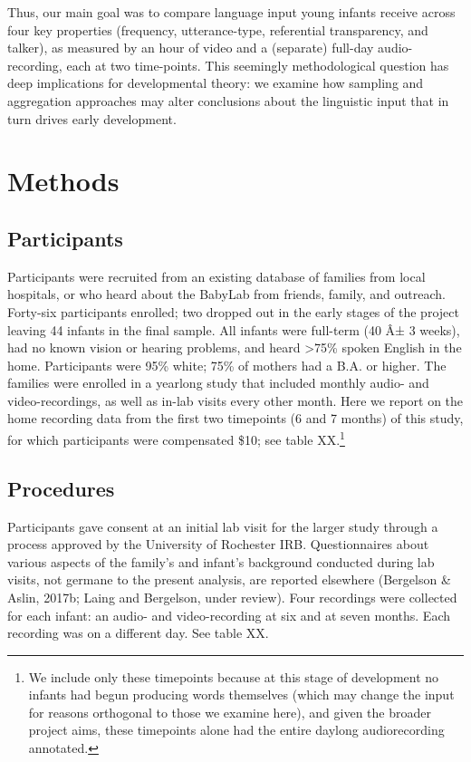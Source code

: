 \documentclass[man]{apa6}
\theoremstyle{definition}
\theoremstyle{definition}
\theoremstyle{definition}
\theoremstyle{remark}
\begin{document}
Thus, our main goal was to compare language input young infants receive
across four key properties (frequency, utterance-type, referential
transparency, and talker), as measured by an hour of video and a
(separate) full-day audio-recording, each at two time-points. This
seemingly methodological question has deep implications for
developmental theory: we examine how sampling and aggregation approaches
may alter conclusions about the linguistic input that in turn drives
early development.

\section{Methods}\label{methods}

\subsection{Participants}\label{participants}

Participants were recruited from an existing database of families from
local hospitals, or who heard about the BabyLab from friends, family,
and outreach. Forty-six participants enrolled; two dropped out in the
early stages of the project leaving 44 infants in the final sample. All
infants were full-term (40 Â± 3 weeks), had no known vision or hearing
problems, and heard \textgreater{}75\% spoken English in the home.
Participants were 95\% white; 75\% of mothers had a B.A. or higher. The
families were enrolled in a yearlong study that included monthly audio-
and video-recordings, as well as in-lab visits every other month. Here
we report on the home recording data from the first two timepoints (6
and 7 months) of this study, for which participants were compensated
\$10; see table
XX.\footnote{We include only these timepoints because at this stage of development no infants had begun producing words themselves (which may change the input for reasons orthogonal to those we examine here), and given the broader project aims, these timepoints alone had the entire daylong audiorecording annotated.}

\subsection{Procedures}\label{procedures}

Participants gave consent at an initial lab visit for the larger study
through a process approved by the University of Rochester IRB.
Questionnaires about various aspects of the family's and infant's
background conducted during lab visits, not germane to the present
analysis, are reported elsewhere (Bergelson \& Aslin, 2017b; Laing and
Bergelson, under review). Four recordings were collected for each
infant: an audio- and video-recording at six and at seven months. Each
recording was on a different day. See table XX.
\end{document}
